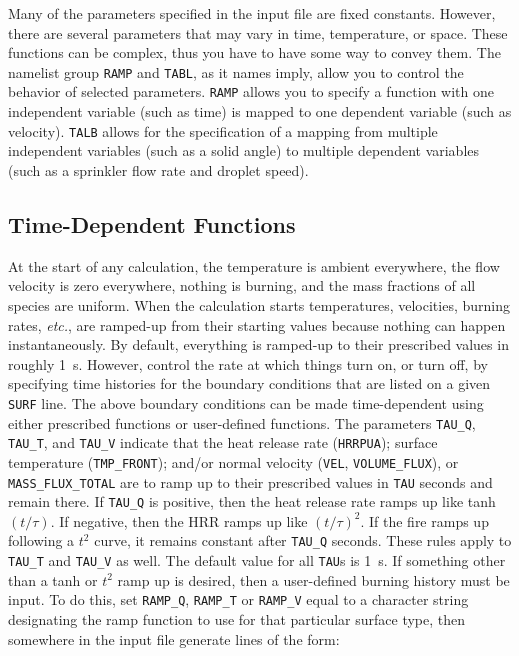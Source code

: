 \documentclass[11pt]{book}
\newcommand{\ct}{\tt\small}
\begin{document}
Many of the parameters specified in the input file are fixed constants. However, there are several parameters that may vary in
time, temperature, or space. These functions can be complex, thus you have to have some way to convey them. The namelist group
{\ct RAMP} and {\ct TABL}, as it names imply, allow you to control the behavior of selected parameters.  {\ct RAMP} allows you
to specify a function with one independent variable (such as time) is mapped to one dependent variable (such as velocity).
{\ct TALB} allows for the specification of a mapping from multiple independent variables (such as a solid angle) to multiple
dependent variables (such as a sprinkler flow rate and droplet speed).

\subsection{Time-Dependent Functions}

At the start of any calculation, the temperature is
ambient everywhere, the flow velocity is zero everywhere, nothing is burning, and
the mass fractions of all species are uniform.
When the calculation starts temperatures, velocities, burning rates,
{\em etc.}, are ramped-up from their starting values because nothing
can happen instantaneously. By default, everything is ramped-up to their
prescribed values in roughly 1~s. However, control the
rate at which things turn on, or turn off, by specifying time histories
for the boundary conditions that are listed on a given {\ct SURF} line.
The above boundary conditions can be made time-dependent using either
prescribed functions or user-defined functions.
The parameters {\ct TAU\_Q}, {\ct TAU\_T}, and {\ct TAU\_V}
indicate that the heat release rate ({\ct HRRPUA}); surface temperature ({\ct TMP\_FRONT});
and/or normal velocity ({\ct VEL}, {\ct VOLUME\_FLUX}), or {\ct MASS\_FLUX\_TOTAL} are to ramp up
to their prescribed values in {\ct TAU} seconds and remain there.
If {\ct TAU\_Q} is positive, then the heat release rate ramps up
like tanh$(t/\tau)$. If negative, then
the HRR ramps up like $(t/\tau)^2$. If the fire ramps up following
a $t^2$ curve, it remains constant after {\ct TAU\_Q} seconds.
These rules apply to {\ct TAU\_T} and {\ct TAU\_V} as well.
The default value for all {\ct TAU}s is 1~s.
If something other than a tanh or $t^2$ ramp up is desired,
then a user-defined burning history must be input. To do this, set
{\ct RAMP\_Q}, {\ct RAMP\_T} or {\ct RAMP\_V}
equal to a character string designating the ramp function to use for that
particular surface type, then somewhere in the input file generate lines
of the form:
\end{document}
